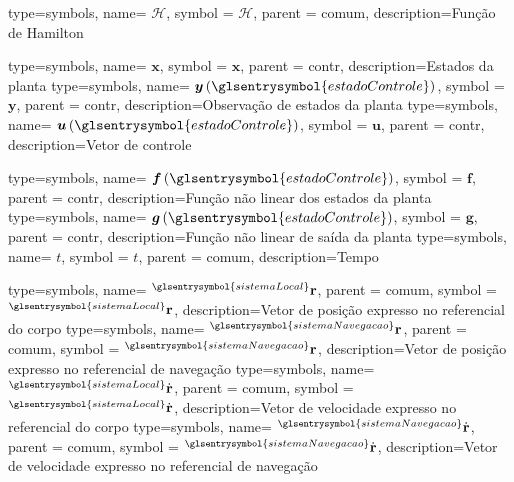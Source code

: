{type=symbols,
  name= \ensuremath{\mathcal{H}},
  symbol = \ensuremath{\mathcal{H}},
parent = comum,
  description={Função de Hamilton}
}

{type=symbols,
  name= \ensuremath{\boldsymbol{x}},
  symbol = \ensuremath{\boldsymbol{x}},
parent = contr,
  description={Estados da planta}
}
{type=symbols,
  name= \ensuremath{\boldsymbol{y}\left(\glsentrysymbol{estadoControle}\right)},
  symbol = \ensuremath{\boldsymbol{y}},
parent = contr,
  description={Observação de estados da planta}
}
{type=symbols,
  name= \ensuremath{\boldsymbol{u}\left(\glsentrysymbol{estadoControle}\right)},
  symbol = \ensuremath{\boldsymbol{u}},
parent = contr,
  description={Vetor de controle}
}

{type=symbols,
  name= \ensuremath{\boldsymbol{f}\left(\glsentrysymbol{estadoControle}\right)},
  symbol = \ensuremath{\boldsymbol{f}},
parent = contr,
  description={Função não linear dos estados da planta}
}
{type=symbols,
  name= \ensuremath{\boldsymbol{g}\left(\glsentrysymbol{estadoControle}\right)},
  symbol = \ensuremath{\boldsymbol{g}},
  parent = contr,
  description={Função não linear de saída da planta}
}
{type=symbols,
  name= \ensuremath{t},
  symbol = \ensuremath{t},
  parent = comum,
  description={Tempo}
}


{type=symbols,
  name= \ensuremath{{}^{\glsentrysymbol{sistemaLocal}}\mathbf{r}},
  parent = {comum},
  symbol = \ensuremath{{}^{\glsentrysymbol{sistemaLocal}}\mathbf{r}},
  description={Vetor de posição expresso no referencial do corpo}
}
{type=symbols,
  name= \ensuremath{{}^{\glsentrysymbol{sistemaNavegacao}}\mathbf{r}},
  parent = {comum},
  symbol = \ensuremath{{}^{\glsentrysymbol{sistemaNavegacao}}\mathbf{r}},
  description={Vetor de posição expresso no referencial de navegação}
}
{type=symbols,
  name= \ensuremath{{}^{\glsentrysymbol{sistemaLocal}}\dot{\mathbf{r}}},
  parent = {comum},
  symbol = \ensuremath{{}^{\glsentrysymbol{sistemaLocal}}\dot{\mathbf{r}}},
  description={Vetor de velocidade expresso no referencial do corpo}
}
{type=symbols,
  name= \ensuremath{{}^{\glsentrysymbol{sistemaNavegacao}}\dot{\mathbf{r}}},
  parent = {comum},
  symbol = \ensuremath{{}^{\glsentrysymbol{sistemaNavegacao}}\dot{\mathbf{r}}},
  description={Vetor de velocidade expresso no referencial de navegação}
}

